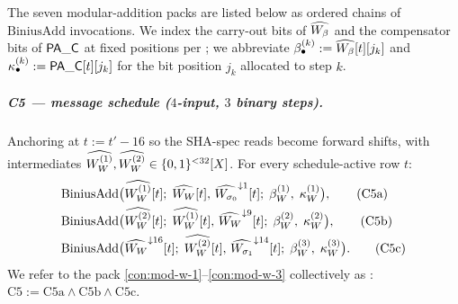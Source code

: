 The seven modular-addition packs are listed below as ordered chains
of $\mathrm{BiniusAdd}$ invocations. We index the carry-out bits of
$\widehat{W_\beta}$ and the compensator bits of $\mathsf{PA\_C}$ at fixed
positions per ; we abbreviate
$\beta_\bullet^{(k)} := \widehat{W_\beta}[t][j_k]$ and
$\kappa_\bullet^{(k)} := \mathsf{PA\_C}[t][j_k]$ for the bit position
$j_k$ allocated to step $k$.

\subparagraph{C5 — message schedule ($4$-input, $3$ binary steps).}
Anchoring at $t := t' - 16$ so the SHA-spec reads become forward
shifts, with intermediates
$\widehat{W_W^{(1)}}, \widehat{W_W^{(2)}} \in \{0,1\}^{<32}[X]$. For every
schedule-active row $t$:
\begin{align}
\mathrm{BiniusAdd}\bigl(
    &\widehat{W_W^{(1)}}[t];\;
    \widehat{W_W}[t],\,
    \widehat{W_{\sigma_0}}^{\downarrow 1}[t];\;
    \beta_W^{(1)},\; \kappa_W^{(1)}\bigr), \tag{C5a}\label{con:mod-w-1}\\
\mathrm{BiniusAdd}\bigl(
    &\widehat{W_W^{(2)}}[t];\;
    \widehat{W_W^{(1)}}[t],\,
    \widehat{W_W}^{\downarrow 9}[t];\;
    \beta_W^{(2)},\; \kappa_W^{(2)}\bigr), \tag{C5b}\label{con:mod-w-2}\\
\mathrm{BiniusAdd}\bigl(
    &\widehat{W_W}^{\downarrow 16}[t];\;
    \widehat{W_W^{(2)}}[t],\,
    \widehat{W_{\sigma_1}}^{\downarrow 14}[t];\;
    \beta_W^{(3)},\; \kappa_W^{(3)}\bigr). \tag{C5c}\label{con:mod-w-3}
\end{align}
We refer to the pack \eqref{con:mod-w-1}--\eqref{con:mod-w-3}
collectively as :
\label{con:mod-w}\(\text{C5} := \text{C5a} \wedge \text{C5b} \wedge \text{C5c}\).

